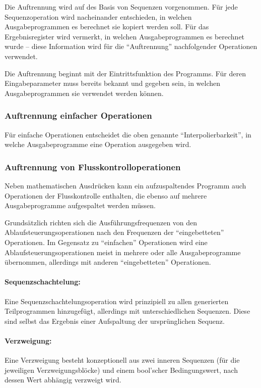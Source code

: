 \documentclass[twoside,a4paper,fleqn,12pt]{book}
\begin{document}
Die Auftrennung wird auf des Basis von Sequenzen vorgenommen. Für jede Sequenzoperation wird nacheinander
entschieden, in welchen Ausgabeprogrammen es berechnet sie kopiert werden soll. Für das Ergebnisregister
wird vermerkt, in welchen Ausgabeprogrammen es berechnet wurde -- diese Information wird für
die "`Auftrennung"' nachfolgender Operationen verwendet.

Die Auftrennung beginnt mit der Eintrittsfunktion des Programms. Für deren Eingabeparameter muss bereits bekannt und gegeben
sein, in welchen Ausgabeprogrammen sie verwendet werden können.

\subsubsection{Auftrennung einfacher Operationen}

Für einfache Operationen entscheidet die oben genannte "`Interpolierbarkeit"', in welche Ausgabeprogramme eine Operation ausgegeben wird.

\subsubsection{Auftrennung von Flusskontrolloperationen}

Neben mathematischen Ausdrücken kann ein aufzuspaltendes Programm auch Operationen der Flusskontrolle enthalten,
die ebenso auf mehrere Ausgabeprogramme aufgespaltet werden müssen.

Grundsätzlich richten sich die Ausführungsfrequenzen von den Ablaufsteuerungsoperationen nach den Frequenzen der 
"`eingebetteten"' Operationen. Im Gegensatz zu "`einfachen"' Operationen wird eine Ablaufsteuerungsoperationen meist
in mehrere oder alle Ausgabeprogramme übernommen, allerdings mit anderen "`eingebetteten"' Operationen.

\paragraph{Sequenzschachtelung:} Eine Sequenzschachtelungsoperation wird prinzipiell zu allen generierten Teilprogrammen hinzugefügt,
allerdings mit unterschiedlichen Sequenzen. Diese sind selbst das Ergebnis einer Aufspaltung der ursprünglichen Sequenz.

\paragraph{Verzweigung:} Eine Verzweigung besteht konzeptionell aus zwei inneren Sequenzen (für die jeweiligen Verzweigungsblöcke)
und einem bool'scher Bedingungswert, nach dessen Wert abhängig verzweigt wird.
\end{document}
